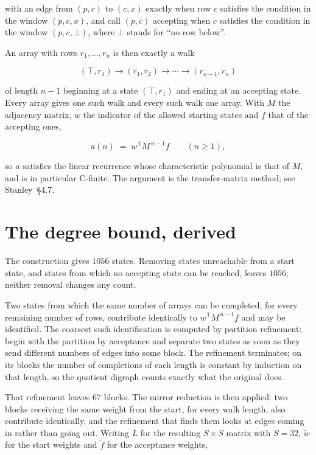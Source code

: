 \documentclass[11pt]{article}
\theoremstyle{definition}
\begin{document}
with an edge from $(p,c)$ to $(c,x)$ exactly when row $c$ satisfies the condition in the window $(p,c,x)$, and call $(p,c)$ accepting when $c$ satisfies the condition in the window $(p,c,\bot)$, where $\bot$ stands for ``no row below''.

An array with rows $r_1,\dots,r_n$ is then exactly a walk

\[(\top,r_1) \to (r_1,r_2) \to \cdots \to (r_{n-1},r_n)\]

of length $n-1$ beginning at a state $(\top,r_1)$ and ending at an accepting state. Every array gives one such walk and every such walk one array. With $M$ the adjacency matrix, $w$ the indicator of the allowed starting states and $f$ that of the accepting ones,

\[a(n) \;=\; w^{\mathsf T} M^{\,n-1} f \qquad (n \ge 1),\]

so $a$ satisfies the linear recurrence whose characteristic polynomial is that of $M$, and is in particular C-finite. The argument is the transfer-matrix method; see Stanley~\S4.7.

\section{The degree bound, derived}

The construction gives $1056$ states. Removing states unreachable from a start state, and states from which no accepting state can be reached, leaves $1056$; neither removal changes any count.

Two states from which the same number of arrays can be completed, for every remaining number of rows, contribute identically to $w^{\mathsf T}M^{\,n-1}f$ and may be identified. The coarsest such identification is computed by partition refinement: begin with the partition by acceptance and separate two states as soon as they send different numbers of edges into some block. The refinement terminates; on its blocks the number of completions of each length is constant by induction on that length, so the quotient digraph counts exactly what the original does.

That refinement leaves $67$ blocks. The mirror reduction is then applied: two blocks receiving the same weight from the start, for every walk length, also contribute identically, and the refinement that finds them looks at edges coming in rather than going out. Writing $L$ for the resulting $S \times S$ matrix with $S = 32$, $\tilde w$ for the start weights and $\tilde f$ for the acceptance weights,
\end{document}
